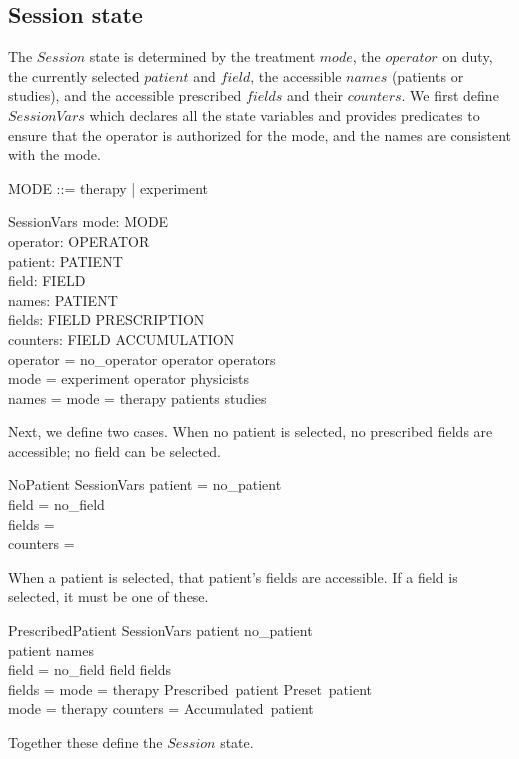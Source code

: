 \subsection{Session state}

The $Session$ state is determined by the treatment $mode$, the
$operator$ on duty, the currently selected $patient$ and $field$, the
accessible $names$ (patients or studies), and the accessible
prescribed $fields$ and their $counters$.  We first define
$SessionVars$ which declares all the state variables and provides
predicates to ensure that the operator is authorized for the mode, and
the names are consistent with the mode.

\begin{zed}
	MODE ::= therapy | experiment
\end{zed}

\begin{schema}{SessionVars}
	mode: MODE \\
	operator: OPERATOR \\
	patient: PATIENT \\
	field: FIELD \\
	names: \power PATIENT \\
	fields: FIELD \pfun PRESCRIPTION \\
	counters: FIELD \pfun ACCUMULATION \\
\where
	operator = no\_operator \lor operator \in operators \\
	mode = experiment \implies operator \in physicists \\
	names = \IF mode = therapy \THEN patients \ELSE studies
\end{schema}
Next, we define two cases.  When no patient is selected, no
prescribed fields are accessible; no field can be selected.

\begin{schema}{NoPatient}
	SessionVars
\where
	patient = no\_patient \\
	field = no\_field \\
	fields = \emptyset \\
	counters = \emptyset \\
\end{schema}
When a patient is selected, that patient's fields are accessible.
If a field is selected, it must be one of these.

\begin{schema}{PrescribedPatient}
	SessionVars
\where
	patient \neq no\_patient \\
	patient \in names \\
	field = no\_field \lor field \in \dom fields \\
	fields = \IF mode = therapy \THEN Prescribed~patient \ELSE Preset~patient \\
	mode = therapy \implies counters = Accumulated~patient \\
\end{schema}
Together these define the $Session$ state.

